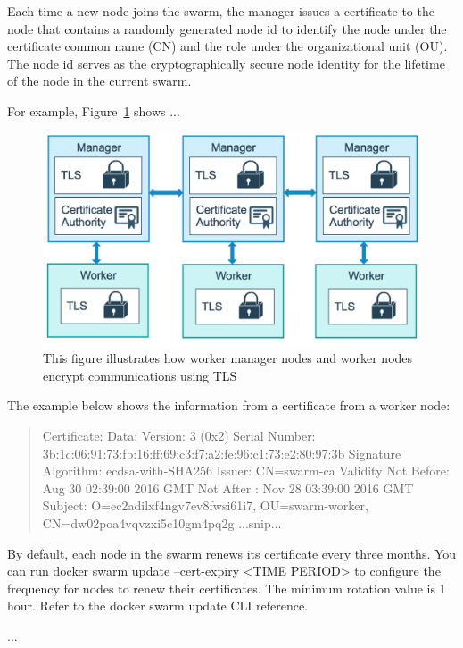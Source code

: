 Each time a new node joins the swarm, the manager issues a certificate to
the node that contains a randomly generated node id to identify the node
under the certificate common name (CN) and the role under the
organizational unit (OU). The node id serves as the cryptographically
secure node identity for the lifetime of the node in the current swarm.


For example, Figure~\ref{fig-swarm-pki} shows ... 

\begin{figure}[t]
  \center{}
  \includegraphics[width=.5\textwidth]{images/swarm-mode-pki.png}
  \caption{This figure illustrates how worker manager nodes and worker nodes 
encrypt communications using TLS
  \label{fig-swarm-pki} }
\end{figure}

The example below shows the information from a certificate from a worker
node:

\begin{quote}
Certificate:
    Data:
        Version: 3 (0x2)
        Serial Number:
            3b:1c:06:91:73:fb:16:ff:69:c3:f7:a2:fe:96:c1:73:e2:80:97:3b
        Signature Algorithm: ecdsa-with-SHA256
        Issuer: CN=swarm-ca
        Validity
            Not Before: Aug 30 02:39:00 2016 GMT
            Not After : Nov 28 03:39:00 2016 GMT
        Subject: O=ec2adilxf4ngv7ev8fwsi61i7, OU=swarm-worker,
CN=dw02poa4vqvzxi5c10gm4pq2g
...snip...
\end{quote}

By default, each node in the swarm renews its certificate every three
months. You can run docker swarm update --cert-expiry <TIME PERIOD> to
configure the frequency for nodes to renew their certificates. The minimum
rotation value is 1 hour. Refer to the docker swarm update CLI reference.


 



...



